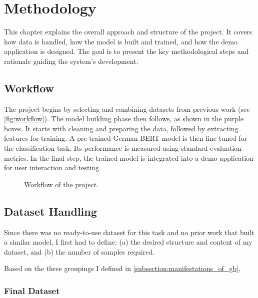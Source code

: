 \chapter{Methodology}
This chapter explains the overall approach and structure of the project. It covers how data is handled, how the model is built and trained, and how the demo application is designed. The goal is to present the key methodological steps and rationale guiding the system’s development.

\section{Workflow}
The project begins by selecting and combining datasets from previous work (see \autoref{fig:workflow}). The model building phase then follows, as shown in the purple boxes. It starts with cleaning and preparing the data, followed by extracting features for training. A pre-trained German BERT model is then fine-tuned for the classification task. Its performance is measured using standard evaluation metrics. In the final step, the trained model is integrated into a demo application for user interaction and testing.

\vspace{1cm} 
\begin{figure}[ht]
    \centering
    \scalebox{0.8}{}
    \caption{Workflow of the project.}
    \label{fig:workflow}
\end{figure}
\vspace{1cm} 

\section{Dataset Handling}

Since there was no ready-to-use dataset for this task and no prior work that built a similar model, I first had to define: (a) the desired structure and content of my dataset, and (b) the number of samples required.

Based on the three groupings I defined in \autoref{subsection:manifestations_of_gb}, 

\subsection{Final Dataset}

